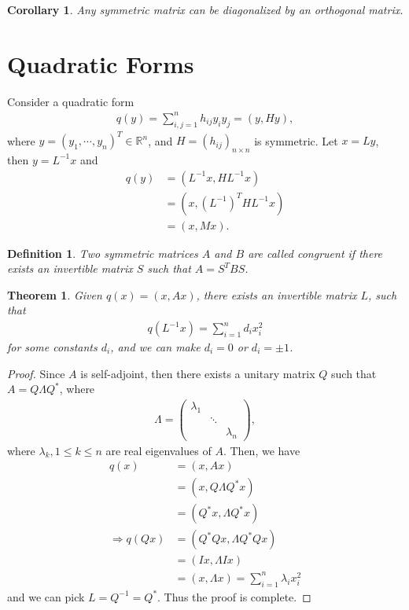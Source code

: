 \documentclass[11pt]{book}
\newtheorem{definition}{Definition}[section]
\newtheorem{theorem}{Theorem}[section]
\newtheorem{corollary}{Corollary}[section]
\theoremstyle{definition}
\numberwithin{equation}{subsection}
\begin{document}
\medskip

\begin{corollary}
Any symmetric matrix can be diagonalized by an orthogonal matrix.
\end{corollary}

\medskip

\section{Quadratic Forms}
Consider a quadratic form
\begin{align*}
    q(y) = \sum^n_{i,j=1} h_{ij} y_i y_j = (y, Hy),
\end{align*}
where $y = (y_1, \cdots, y_n)^T \in \mathbb{R}^n$, and $H = (h_{ij})_{n\times n}$ is symmetric. Let $x = Ly$, then $y = L^{-1}x$ and
\begin{align*}
    q(y) & = \left(L^{-1}x, H L^{-1}x\right) \\
    & = \left(x, \left(L^{-1}\right)^T H L^{-1}x\right) \\
    & = (x, Mx).
\end{align*}

\medskip

\begin{definition}
Two symmetric matrices $A$ and $B$ are called congruent if there exists an invertible matrix $S$ such that $A = S^T B S$.
\end{definition}

\medskip

\begin{theorem}
Given $q(x) = (x, Ax)$, there exists an invertible matrix $L$, such that
\begin{align*}
    q\left(L^{-1}x\right) = \sum^n_{i=1} d_i x_i^2
\end{align*}
for some constants $d_i$, and we can make $d_i = 0$ or $d_i = \pm 1$.
\end{theorem}
\begin{proof}
Since $A$ is self-adjoint, then there exists a unitary matrix $Q$ such that $A = Q\Lambda Q^*$, where 
\begin{align*}
    \Lambda = \begin{pmatrix}
    \lambda_1 &  &  \\
     & \ddots  &  \\
     &   & \lambda_n
    \end{pmatrix},
\end{align*}
where $\lambda_k, 1\leq k \leq n$ are real eigenvalues of $A$. Then, we have
\begin{align*}
    q(x) & = (x, Ax) \\
    & = (x, Q\Lambda Q^* x) \\
    & = (Q^* x, \Lambda Q^* x) \\
    \Rightarrow q(Qx) & = (Q^* Q x, \Lambda Q^* Q x) \\
    & = (Ix, \Lambda I x) \\
    & = (x, \Lambda x) = \sum^n_{i=1} \lambda_i x_i^2
\end{align*}
and we can pick $L = Q^{-1} = Q^*$. Thus the proof is complete.
\end{proof}
\end{document}
